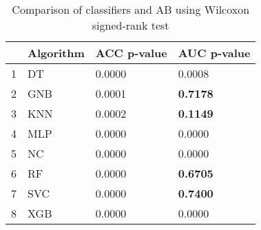 \begin{table}
\footnotesize
\caption{Comparison of classifiers and AB using Wilcoxon signed-rank test}
\label{tab:wilcoxon comparison}
\begin{tabular}{llll}
\hline
 & Algorithm & ACC p-value & AUC p-value \\
\hline
1 & DT & 0.0000 & 0.0008 \\
2 & GNB & 0.0001 & \textbf{0.7178} \\
3 & KNN & 0.0002 & \textbf{0.1149} \\
4 & MLP & 0.0000 & 0.0000 \\
5 & NC & 0.0000 & 0.0000 \\
6 & RF & 0.0000 & \textbf{0.6705} \\
7 & SVC & 0.0000 & \textbf{0.7400} \\
8 & XGB & 0.0000 & 0.0000 \\
\hline
\end{tabular}
\end{table}
